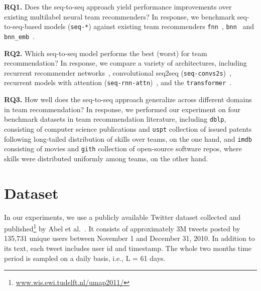 \documentclass[sigconf]{acmart}
\begin{document}
\noindent\textbf{RQ1.} Does the seq-to-seq approach yield performance improvements over existing multilabel neural team recommenders?
In response, we benchmark seq-to-seq-based models (\texttt{seq-*}) against existing team recommenders \texttt{fnn}~\cite{DBLP:conf/cikm/RadFKSB20}, \texttt{bnn}~\cite{DBLP:conf/cikm/RadFKSB20} and \texttt{bnn\_emb}~\cite{DBLP:journals/tois/RadFBKSS24}.

\noindent\textbf{RQ2.} Which seq-to-seq model performs the best (worst) for team recommendation?
In response, we compare a variety of architectures, including recurrent recommender networks~\cite{DBLP:conf/wsdm/WuABSJ17}, convolutional seq2seq (\texttt{seq-convs2s})~\cite{DBLP:conf/icml/GehringAGYD17}, recurrent models with attention (\texttt{seq-rnn-attn})~\cite{DBLP:journals/tacl/ZhouCWLX16}, and the \texttt{transformer}~\cite{DBLP:conf/nips/VaswaniSPUJGKP17}.

\noindent\textbf{RQ3.} How well does the seq-to-seq approach generalize across different domains in team recommendation?
In response, we performed our experiment on four benchmark datasets in team recommendation literature, including \texttt{dblp}, consisting of computer science publications and \texttt{uspt} collection of issued patents following long-tailed distribution of skills over teams, on the one hand, and \texttt{imdb} consisting of movies and \texttt{gith} collection of open-source software repos, where skills were distributed uniformly among teams, on the other hand.

\section{Dataset}
In our experiments, we use a publicly available Twitter dataset collected and published\footnote{\href{http://www.wis.ewi.tudelft.nl/umap2011/}{www.wis.ewi.tudelft.nl/umap2011/}} by Abel et al.~\cite{DBLP:conf/um/AbelGHT11}. It consists of approximately 3M tweets posted by 135,731 unique users between November 1 and December 31, 2010. In addition to its text, each tweet includes user id and timestamp. The whole two months time period is sampled on a daily basis, i.e., L = 61 days.
\end{document}
